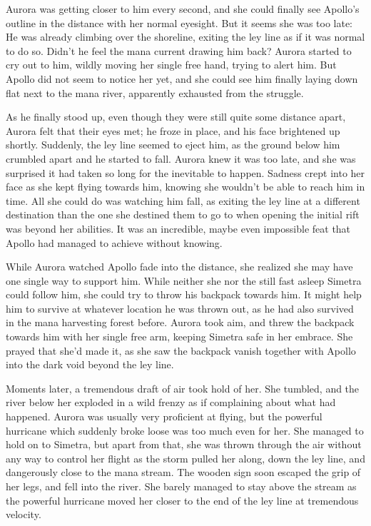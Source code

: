 \fancybreaker{}

Aurora was getting closer to him every second, and she could finally see Apollo's outline in the distance with her normal eyesight. But it seems she was too late: He was already climbing over the shoreline, exiting the ley line as if it was normal to do so. Didn't he feel the mana current drawing him back? Aurora started to cry out to him, wildly moving her single free hand, trying to alert him. But Apollo did not seem to notice her yet, and she could see him finally laying down flat next to the mana river, apparently exhausted from the struggle.

As he finally stood up, even though they were still quite some distance apart, Aurora felt that their eyes met; he froze in place, and his face brightened up shortly. Suddenly, the ley line seemed to eject him, as the ground below him crumbled apart and he started to fall. Aurora knew it was too late, and she was surprised it had taken so long for the inevitable to happen. Sadness crept into her face as she kept flying towards him, knowing she wouldn't be able to reach him in time. All she could do was watching him fall, as exiting the ley line at a different destination than the one she destined them to go to when opening the initial rift was beyond her abilities. It was an incredible, maybe even impossible feat that Apollo had managed to achieve without knowing.

While Aurora watched Apollo fade into the distance, she realized she may have one single way to support him. While neither she nor the still fast asleep Simetra could follow him, she could try to throw his backpack towards him. It might help him to survive at whatever location he was thrown out, as he had also survived in the mana harvesting forest before. Aurora took aim, and threw the backpack towards him with her single free arm, keeping Simetra safe in her embrace. She prayed that she'd made it, as she saw the backpack vanish together with Apollo into the dark void beyond the ley line.

Moments later, a tremendous draft of air took hold of her. She tumbled, and the river below her exploded in a wild frenzy as if complaining about what had happened. Aurora was usually very proficient at flying, but the powerful hurricane which suddenly broke loose was too much even for her. She managed to hold on to Simetra, but apart from that, she was thrown through the air without any way to control her flight as the storm pulled her along, down the ley line, and dangerously close to the mana stream. The wooden sign soon escaped the grip of her legs, and fell into the river. She barely managed to stay above the stream as the powerful hurricane moved her closer to the end of the ley line at tremendous velocity.

